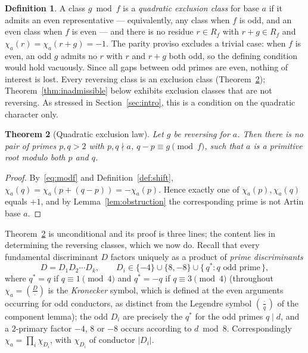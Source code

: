 \documentclass[11pt,reqno]{amsart}
\theoremstyle{plain}
\newtheorem{theorem}{Theorem}
\theoremstyle{definition}
\newtheorem{definition}[theorem]{Definition}
\newcommand{\Leg}[2]{\left(\frac{#1}{#2}\right)}
\begin{document}
\begin{definition}
\label{def:exclusion}
A class $g \bmod f$ is a \emph{quadratic exclusion class} for base $a$ if it
admits an even representative --- equivalently, any class when $f$ is odd, and
an even class when $f$ is even --- and there is no residue $r \in R_f$ with
$r + g \in R_f$ and $\chi_a(r) = \chi_a(r+g) = -1$. The parity proviso
excludes a trivial case: when $f$ is even, an odd $g$ admits no $r$ with $r$
and $r+g$ both odd, so the defining condition would hold vacuously. Since all
gaps between odd primes are even, nothing of interest is lost. Every reversing class is an exclusion class
(Theorem~\ref{thm:exclusion}); Theorem~\ref{thm:inadmissible} below exhibits
exclusion classes that are not reversing. As stressed in
Section~\ref{sec:intro}, this is a condition on the quadratic character only.
\end{definition}

\begin{theorem}[Quadratic exclusion law]
\label{thm:exclusion}
Let $g$ be reversing for $a$. Then there is no pair of primes $p, q > 2$ with
$p, q \nmid a$, $q - p \equiv g \pmod f$, such that $a$ is a primitive root
modulo both $p$ and $q$.
\end{theorem}

\begin{proof}
By~\eqref{eq:modf} and Definition~\ref{def:shift},
$\chi_a(q) = \chi_a(p + (q-p)) = -\chi_a(p)$. Hence exactly one of
$\chi_a(p), \chi_a(q)$ equals $+1$, and by Lemma~\ref{lem:obstruction} the
corresponding prime is not Artin base $a$.
\end{proof}

Theorem~\ref{thm:exclusion} is unconditional and its proof is three lines; the
content lies in determining the reversing classes, which we now do. Recall that
every fundamental discriminant $D$ factors uniquely as a product of
\emph{prime discriminants}
\begin{equation}
\label{eq:primedisc}
  D = D_1 D_2 \cdots D_k, \qquad
  D_i \in \{-4\} \cup \{8, -8\} \cup \{\, q^* : q \text{ odd prime} \,\},
\end{equation}
where $q^* = q$ if $q \equiv 1 \pmod 4$ and $q^* = -q$ if $q \equiv 3 \pmod 4$
(throughout $\chi_a = \Leg{D}{\cdot}$ is the \emph{Kronecker} symbol, which is
defined at the even arguments occurring for odd conductors, as distinct from
the Legendre symbol $\Leg{\cdot}{q}$ of the component lemma);
the odd $D_i$ are precisely the $q^*$ for the odd primes $q \mid d$, and a
$2$-primary factor $-4$, $8$ or $-8$ occurs according to $d \bmod 8$. Correspondingly
$\chi_a = \prod_i \chi_{D_i}$, with $\chi_{D_i}$ of conductor $|D_i|$.
\end{document}
